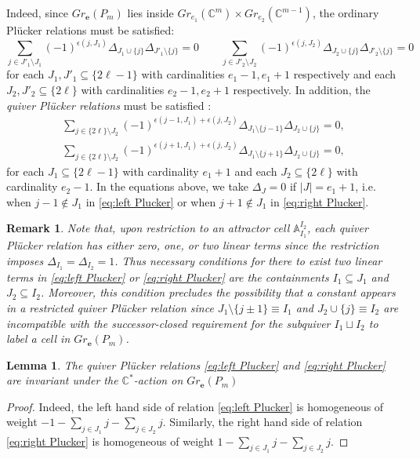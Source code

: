 \documentclass{amsart}
\newtheorem{lemma}[theorem]{Lemma}
\newtheorem{remark}[theorem]{Remark}
\numberwithin{equation}{section}
\renewcommand{\AA}{\mathbb{A}}
\newcommand{\CC}{\mathbb{C}}
\newcommand{\bfe}{\mathbf{e}}
\begin{document}
  Indeed, since $Gr_\bfe(P_m)$ lies inside $Gr_{e_1}(\CC^m)\times Gr_{e_2}(\CC^{m-1})$, the ordinary Pl\"ucker relations must be satisfied:
  \[\sum_{j\in J'_1\setminus J_1} (-1)^{\epsilon(j,J_1)} \Delta_{J_1\cup\{j\}} \Delta_{J'_1\setminus\{j\}}=0
    \qquad
    \sum_{j\in J'_2\setminus J_2} (-1)^{\epsilon(j,J_2)} \Delta_{J_2\cup\{j\}} \Delta_{J'_2\setminus\{j\}}=0\]
  for each $J_1,J'_1\subseteq\{2\ell-1\}$ with cardinalities $e_1-1,e_1+1$ respectively and each $J_2,J'_2\subseteq\{2\ell\}$ with cardinalities $e_2-1,e_2+1$ respectively.
  In addition, the \emph{quiver Pl\"ucker relations} must be satisfied \cite{lorscheid-weist}:
  \begin{align}
    \label{eq:left Plucker} \sum_{j\in \{2\ell\}\setminus J_2} (-1)^{\epsilon(j-1,J_1)+\epsilon(j,J_2)} \Delta_{J_1\setminus\{j-1\}} \Delta_{J_2\cup\{j\}}=0,\\
    \label{eq:right Plucker} \sum_{j\in \{2\ell\}\setminus J_2} (-1)^{\epsilon(j+1,J_1)+\epsilon(j,J_2)} \Delta_{J_1\setminus\{j+1\}} \Delta_{J_2\cup\{j\}}=0,
  \end{align}
  for each $J_1\subseteq\{2\ell-1\}$ with cardinality $e_1+1$ and each $J_2\subseteq\{2\ell\}$ with cardinality $e_2-1$.
  In the equations above, we take $\Delta_{J}=0$ if $|J|=e_1+1$, i.e. when $j-1\notin J_1$ in \eqref{eq:left Plucker} or when $j+1\notin J_1$ in \eqref{eq:right Plucker}.
  \begin{remark}
    \label{rm:linear terms}
    Note that, upon restriction to an attractor cell $\AA_{I_1}^{I_2}$, each quiver Pl\"ucker relation has either zero, one, or two linear terms since the restriction imposes $\Delta_{I_1}=\Delta_{I_2}=1$.
    Thus necessary conditions for there to exist two linear terms in \eqref{eq:left Plucker} or \eqref{eq:right Plucker} are the containments $I_1\subseteq J_1$ and $J_2\subseteq I_2$.
    Moreover, this condition precludes the possibility that a constant appears in a restricted quiver Pl\"ucker relation since $J_1\setminus\{j\pm1\}\equiv I_1$ and $J_2\cup\{j\}\equiv I_2$ are incompatible with the successor-closed requirement for the subquiver $I_1\sqcup I_2$ to label a cell in $Gr_\bfe(P_m)$.
  \end{remark}

  \begin{lemma}
    The quiver Pl\"ucker relations \eqref{eq:left Plucker} and \eqref{eq:right Plucker} are invariant under the $\CC^*$-action on $Gr_\bfe(P_m)$
  \end{lemma}
  \begin{proof}
    Indeed, the left hand side of relation \eqref{eq:left Plucker} is homogeneous of weight $-1 - \sum\limits_{j\in J_1} j - \sum\limits_{j\in J_2} j$.
    Similarly, the right hand side of relation \eqref{eq:right Plucker} is homogeneous of weight $1 - \sum\limits_{j\in J_1} j - \sum\limits_{j\in J_2} j$.
  \end{proof}
\end{document}
